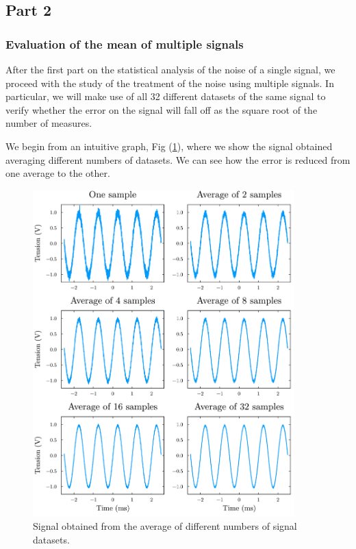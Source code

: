 \documentclass[a4paper,12pt]{article}
\begin{document}
\subsection{Part 2}
\subsubsection{Evaluation of the mean of multiple signals}
\par After the first part on the statistical analysis of the noise of a single signal, 
we proceed with the study of the treatment of the noise using multiple signals. 
In particular, we will make use of all 32 different datasets of the same signal to 
verify whether the error on the signal will fall off as the square root of the number of measures.

\par We begin from an intuitive graph, Fig (\ref{plot:Noise_decay_signal}), where we show
the signal obtained averaging different numbers of datasets. We can see how the error is 
reduced from one average to the other.
\begin{figure}[H]
    \centering
    \includegraphics[width=0.9\textwidth]{Signal_fix.pdf}
    \caption{Signal obtained from the average of different numbers of signal datasets.}
    \label{plot:Noise_decay_signal}
\end{figure}
\end{document}
